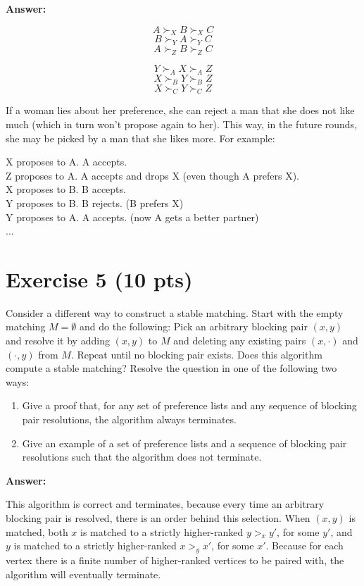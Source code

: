 \documentclass{article}
\begin{document}
\bigskip \noindent \textbf{Answer:}

$$A \succ_X B \succ_X C$$
$$B \succ_Y A \succ_Y C$$ 
$$A \succ_Z B \succ_Z C$$

$$Y \succ_A X \succ_A Z$$
$$X \succ_B Y \succ_B Z$$ 
$$X \succ_C Y \succ_C Z$$

If a woman lies about her preference, she can reject a man that she does not like much (which in turn won't propose again to her). This way, in the future rounds, she may be picked by a man that she likes more. For example:

\bigskip
\noindent X proposes to A. A accepts. \\
\noindent Z proposes to A. A accepts and drops X (even though A prefers X). \\
\noindent X proposes to B. B accepts. \\
\noindent Y proposes to B. B rejects. (B prefers X) \\
\noindent Y proposes to A. A accepts. (now A gets a better partner) \\
\noindent ...

\section{Exercise 5 (10 pts)}

Consider a different way to construct a stable matching. Start with the empty matching $M = \emptyset$ and do the following: Pick an arbitrary blocking pair $(x, y)$ and resolve it by adding $(x, y)$ to $M$ and deleting any existing pairs $(x, \cdot)$ and $(\cdot, y)$ from $M$. Repeat until no blocking pair exists. Does this algorithm compute a stable matching? Resolve the question in one of the following two ways:

\begin{enumerate}
\item Give a proof that, for any set of preference lists and any sequence of blocking pair resolutions, the algorithm always terminates.
\item Give an example of a set of preference lists and a sequence of blocking pair resolutions such that the algorithm does not terminate.
\end{enumerate}


\bigskip \noindent \textbf{Answer:}

This algorithm is correct and terminates, because every time an arbitrary blocking pair is resolved, there is an order behind this selection. When $(x,y)$ is matched, both $x$ is matched to a strictly higher-ranked $y >_x y'$, for some $y'$, and $y$ is matched to a strictly higher-ranked $x >_y x'$, for some $x'$.
Because for each vertex there is a finite number of higher-ranked vertices to be paired with, the algorithm will eventually terminate.
\end{document}

